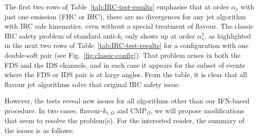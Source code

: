\documentclass[nofootinbib,twocolumn,preprintnumbers,superscriptaddress,aps]{revtex4-2}
\newcommand{\as}{\alpha_s}
\begin{document}
The first two rows of Table~\ref{tab:IRC-test-results} emphasise that at order $\as$ with just one emission (FHC or IHC), there are no divergences for any jet algorithm with IRC safe kinematics, even without a special treatment of flavour.
%
The classic IRC safety problem of standard anti-$k_t$ only shows up at order $\as^2$, as highlighted in the next two rows of Table~\ref{tab:IRC-test-results} for a configuration with one double-soft pair (see Fig.~\ref{fig:classic-config}).
%
That problem arises in both the FDS and the IDS channels, and in each
case it appears for the subset of events where the FDS or IDS pair is
at large angles.
%
From the table, it is clear that all flavour jet algorithms solve that original IRC safety issue.


However, the tests reveal new issues for all algorithms other than our
IFN-based procedure. 
%
In two cases, flavour-$k_{t,\Omega}$ and CMP$_\Omega$, we will propose
modifications that seem to resolve the problem(s).
%
For the interested reader, the summary of the issues is as follows:
%
\end{document}
